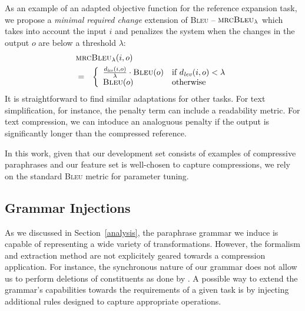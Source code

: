 \documentclass[11pt]{article}
\begin{document}
As an example of an adapted objective function for the reference
expansion task, we propose a \emph{minimal required change} extension
of \textsc{Bleu} -- $\textsc{mrcBleu}_\lambda$ which takes into
account the input $i$ and penalizes the system when the changes in the
output $o$ are below a threshold $\lambda$:
\begin{eqnarray}
  \lefteqn{ \textsc{mrcBleu}_\lambda(i, o) } \nonumber\\
  &=& \left\{ \begin{array}{ll}
      \frac{d_{\mathit{lev}}(i, o)}{\lambda} \cdot \textsc{Bleu}(o) & \textrm{if
        $d_{\mathit{lev}}(i, o) <\lambda$} \nonumber \\ 
      \textsc{Bleu}(o) & \textrm{otherwise}
\end{array} \right.
\end{eqnarray} 
It is straightforward to find similar adaptations for other tasks. For
text simplification, for instance, the penalty term can include a
readability metric. For text compression, we can intoduce an
analoguous penalty if the output is significantly longer than the
compressed reference.

In this work, given that our development set consists of examples of
compressive paraphrases and our feature set is well-chosen to capture
compressions, we rely on the standard \textsc{Bleu} metric for
parameter tuning.



\subsection{Grammar Injections} \label{injection}

As we discussed in Section~\ref{analysis}, the paraphrase grammar we
induce is capable of representing a wide variety of
transformations. However, the formalism and extraction method are not
explicitely geared towards a compression application. For instance,
the synchronous nature of our grammar does not allow us to perform
deletions of constituents as done by .  A possible
way to extend the grammar's capabilities towards the requirements of a
given task is by injecting additional rules designed to capture
appropriate operations. 
\end{document}
